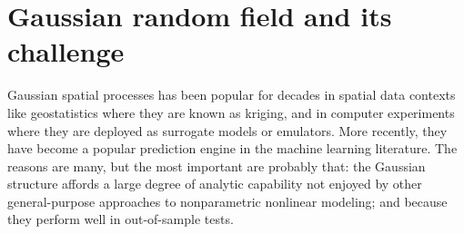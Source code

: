 \documentclass[
12pt, %
a4paper, %
oneside, %
headinclude,footinclude, %
BCOR5mm, %
]{scrartcl}
\title{\normalfont\spacedallcaps{Understanding of spatial problem for Large Datasets}} %
\author{\spacedlowsmallcaps{Yewen Chen}} %
\date{} %
\begin{document}
\renewcommand{\UrlFont}{\small\tt}

\setlength{\abovecaptionskip}{0pt}
\setlength{\belowcaptionskip}{10pt}
\renewcommand{\algorithmicrequire}{\textbf{Input:}}  %
\renewcommand{\algorithmicensure}{\textbf{Update step:}} %
\renewcommand{\sectionmark}[1]{\markright{\spacedlowsmallcaps{#1}}} %
\lehead{\mbox{\llap{\small\thepage\kern1em\color{halfgray} \vline}\color{halfgray}\hspace{0.5em}\rightmark\hfil}} %

\pagestyle{scrheadings} %


\maketitle %

\setcounter{tocdepth}{2} %

\tableofcontents %

\listoffigures %

\listoftables %

\newpage
\section{Gaussian random field and its challenge}
Gaussian spatial processes has been popular for decades in spatial data contexts like geostatistics where they are known as kriging, and in computer experiments where they are deployed as surrogate models or emulators. More recently, they have become a popular prediction engine in the machine learning literature. The reasons are many, but the most important are probably that: the Gaussian structure affords a large degree of analytic capability not enjoyed by other general-purpose approaches to nonparametric nonlinear modeling; and because they perform well in out-of-sample tests.
\end{document}
